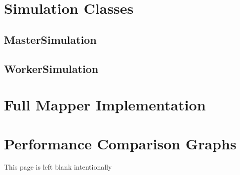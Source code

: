 \documentclass[12pt]{report}
\begin{document}
\begin{appendices}

\chapter{Simulation Classes}
\section{MasterSimulation}

\clearpage

\clearpage
\section{WorkerSimulation}

\clearpage

\clearpage
\chapter{Full Mapper Implementation}

\clearpage

\clearpage
\chapter{Performance Comparison Graphs}
\clearpage
This page is left blank intentionally

\end{appendices}
\end{document}
